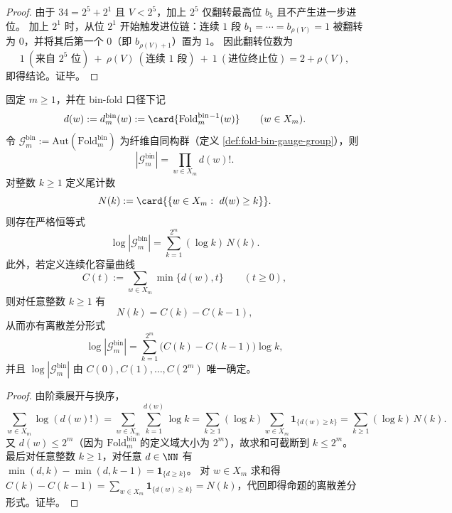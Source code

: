 \begin{proof}
由于 \(34=2^5+2^1\) 且 \(V<2^5\)，加上 \(2^5\) 仅翻转最高位 \(b_5\) 且不产生进一步进位。
加上 \(2^1\) 时，从位 \(2^1\) 开始触发进位链：连续 \(1\) 段 \(b_1=\cdots=b_{\rho(V)}=1\) 被翻转为 \(0\)，并将其后第一个 \(0\)（即 \(b_{\rho(V)+1}\)）置为 \(1\)。
因此翻转位数为
\[
1\ (\text{来自 }2^5\text{ 位})\ +\ \rho(V)\ (\text{连续 }1\text{ 段})\ +\ 1\ (\text{进位终止位})
=2+\rho(V),
\]
即得结论。证毕。
\end{proof}

\begin{proposition}\label{prop:fold-bin-gauge-volume-stieltjes-sum}
固定 \(m\ge 1\)，并在 bin-fold 口径下记
\[
d(w):=d^{\mathrm{bin}}_m(w):=\card{\mathrm{Fold}^{\mathrm{bin}}_m{}^{-1}(w)}\qquad(w\in X_m).
\]
令 \(\mathcal{G}^{\mathrm{bin}}_m:=\mathrm{Aut}(\mathrm{Fold}^{\mathrm{bin}}_m)\) 为纤维自同构群（定义 \ref{def:fold-bin-gauge-group}），则
\[
|\mathcal{G}^{\mathrm{bin}}_m|=\prod_{w\in X_m} d(w)!.
\]
对整数 \(k\ge 1\) 定义尾计数
\[
N(k):=\card{\{w\in X_m:\ d(w)\ge k\}}.
\]
则存在严格恒等式
\[
\log|\mathcal{G}^{\mathrm{bin}}_m|
=\sum_{k=1}^{2^m}(\log k)\,N(k).
\]
此外，若定义连续化容量曲线
\[
C(t):=\sum_{w\in X_m}\min\{d(w),t\}\qquad(t\ge 0),
\]
则对任意整数 \(k\ge 1\) 有
\[
N(k)=C(k)-C(k-1),
\]
从而亦有离散差分形式
\[
\log|\mathcal{G}^{\mathrm{bin}}_m|
=\sum_{k=1}^{2^m}\bigl(C(k)-C(k-1)\bigr)\log k,
\]
并且 \(\log|\mathcal{G}^{\mathrm{bin}}_m|\) 由 \(C(0),C(1),\dots,C(2^m)\) 唯一确定。
\end{proposition}

\begin{proof}
由阶乘展开与换序，
\[
\sum_{w\in X_m}\log(d(w)!)
=\sum_{w\in X_m}\sum_{k=1}^{d(w)}\log k
=\sum_{k\ge 1}(\log k)\sum_{w\in X_m}\mathbf 1_{\{d(w)\ge k\}}
=\sum_{k\ge 1}(\log k)\,N(k).
\]
又 \(d(w)\le 2^m\)（因为 \(\mathrm{Fold}^{\mathrm{bin}}_m\) 的定义域大小为 \(2^m\)），故求和可截断到 \(k\le 2^m\)。
最后对任意整数 \(k\ge 1\)，对任意 \(d\in\NN\) 有
\(
\min(d,k)-\min(d,k-1)=\mathbf 1_{\{d\ge k\}}
\)。
对 \(w\in X_m\) 求和得
\(
C(k)-C(k-1)=\sum_{w\in X_m}\mathbf 1_{\{d(w)\ge k\}}=N(k)
\)，代回即得命题的离散差分形式。证毕。
\end{proof}

